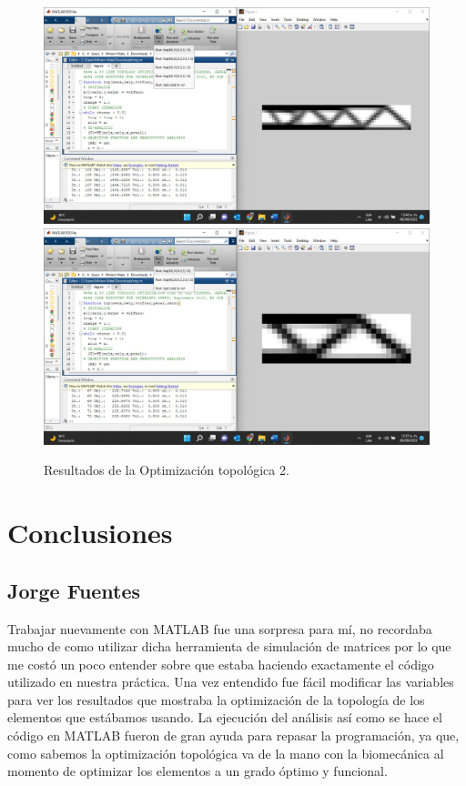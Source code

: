 \documentclass{article}
\begin{document}
\begin{figure}[htp]
\centering
   { \includegraphics[width=1\textwidth]{Optimizar 2.jpeg}}
    {\includegraphics[width=1\textwidth]{Optimizacion 2.jpeg}}
  \caption{Resultados de la Optimización topológica 2.}
\end{figure}
   
 \newpage
\section{Conclusiones}
\subsection{Jorge  Fuentes}
Trabajar nuevamente con MATLAB fue una sorpresa para mí, no recordaba mucho de como utilizar dicha herramienta de simulación de matrices por lo que me costó un poco entender sobre que estaba haciendo exactamente el código utilizado en nuestra práctica. Una vez entendido fue fácil modificar las variables para ver los resultados que mostraba la optimización de la topología de los elementos que estábamos usando. La ejecución del análisis así como se hace el código en MATLAB fueron de gran ayuda para repasar la programación, ya que, como sabemos la optimización topológica va de la mano con la biomecánica al momento de optimizar los elementos a un grado óptimo y funcional.
\end{document}
